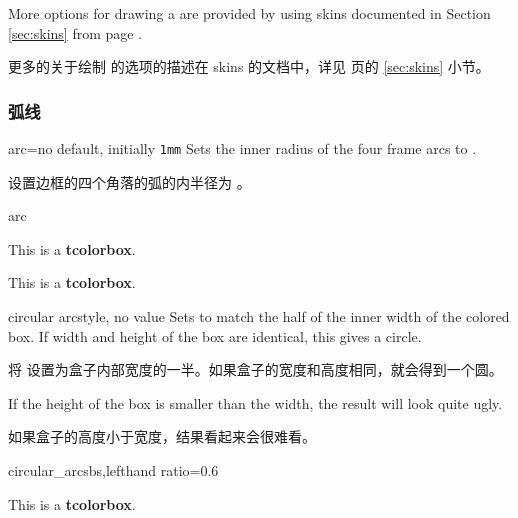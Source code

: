   \bigskip
  \begin{marker}
  More options for drawing a  are provided by using skins documented in
  Section \ref{sec:skins} from page \pageref{sec:skins}.
  
  更多的关于绘制  的选项的描述在 skins 的文档中，详见 \pageref{sec:skins} 页的 \ref{sec:skins} 小节。
  \end{marker}



\subsubsection{弧线}
\begin{docTcbKey}{arc}{=}{no default, initially \texttt{1mm}}
Sets the inner radius of the four frame arcs to .

设置边框的四个角落的弧的内半径为 。
\begin{exdispExample}{arc}

\begin{tcolorbox}[arc=0mm]
This is a \textbf{tcolorbox}.
\end{tcolorbox}
\begin{tcolorbox}[arc=3mm]
This is a \textbf{tcolorbox}.
\end{tcolorbox}
\end{exdispExample}
\end{docTcbKey}


\begin{docTcbKey}[][doc new=2015-05-05]{circular arc}{}{style, no value}
  Sets  to match the half of the inner width of the colored box.
  If width and height of the box are identical, this gives a circle.
  
  将  设置为盒子内部宽度的一半。如果盒子的宽度和高度相同，就会得到一个圆。
  \begin{marker}
  If the height of the box is smaller than the width, the result will look
  quite ugly.
  
  如果盒子的高度小于宽度，结果看起来会很难看。   
  \end{marker}
  \begin{exdispExample*}{circular_arc}{sbs,lefthand ratio=0.6}
  \begin{tcolorbox}[width=3cm,
  colback=red!5!white,
  colframe=red!75!black,
  halign=center,valign=center,
  square,circular arc]
  This is a \textbf{tcolorbox}.
  \end{tcolorbox}
  \end{exdispExample*}
  \end{docTcbKey}
  
